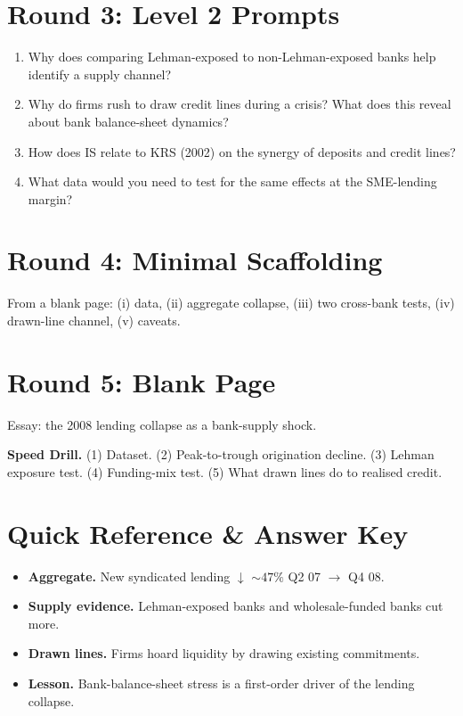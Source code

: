 \documentclass[11pt]{article}
\begin{document}
\section*{Round 3: Level 2 Prompts}
\begin{enumerate}
\item Why does comparing Lehman-exposed to non-Lehman-exposed banks help identify a supply channel?
\item Why do firms rush to draw credit lines during a crisis? What does this reveal about bank balance-sheet dynamics?
\item How does IS relate to KRS (2002) on the synergy of deposits and credit lines?
\item What data would you need to test for the same effects at the SME-lending margin?
\end{enumerate}

\section*{Round 4: Minimal Scaffolding}
From a blank page: (i) data, (ii) aggregate collapse, (iii) two cross-bank tests, (iv) drawn-line channel, (v) caveats.

\section*{Round 5: Blank Page}
Essay: the 2008 lending collapse as a bank-supply shock.

\vspace{6pt}
\begin{drillbox}
\textbf{Speed Drill.} (1) Dataset. (2) Peak-to-trough origination decline. (3) Lehman exposure test. (4) Funding-mix test. (5) What drawn lines do to realised credit.
\end{drillbox}

\section*{Quick Reference \& Answer Key}
\begin{answerbox}
\begin{itemize}
\item \textbf{Aggregate.} New syndicated lending $\downarrow$ $\sim 47\%$ Q2 07 $\to$ Q4 08.
\item \textbf{Supply evidence.} Lehman-exposed banks and wholesale-funded banks cut more.
\item \textbf{Drawn lines.} Firms hoard liquidity by drawing existing commitments.
\item \textbf{Lesson.} Bank-balance-sheet stress is a first-order driver of the lending collapse.
\end{itemize}
\end{answerbox}
\end{document}
